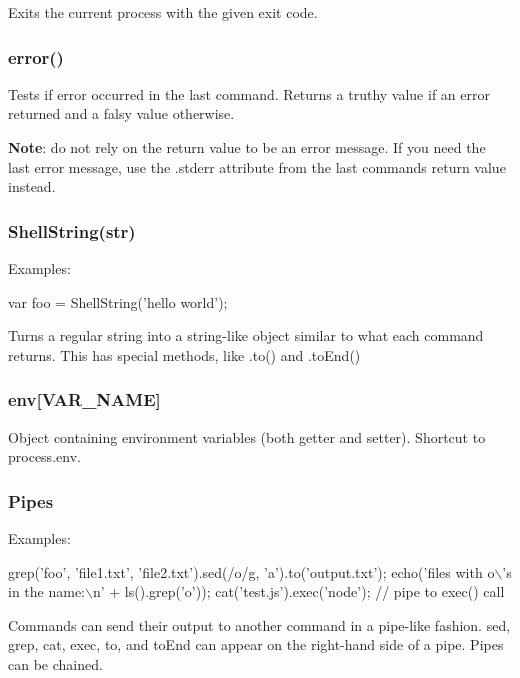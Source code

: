 Exits the current process with the given exit code.

\subsubsection*{error()}

Tests if error occurred in the last command. Returns a truthy value if an error returned and a falsy value otherwise.

{\bfseries Note}\+: do not rely on the return value to be an error message. If you need the last error message, use the {\ttfamily .stderr} attribute from the last command\textquotesingle{}s return value instead.

\subsubsection*{Shell\+String(str)}

Examples\+:


\begin{DoxyCode}
var foo = ShellString('hello world');
\end{DoxyCode}


Turns a regular string into a string-\/like object similar to what each command returns. This has special methods, like {\ttfamily .to()} and {\ttfamily .to\+End()}

\subsubsection*{env\mbox{[}\textquotesingle{}V\+A\+R\+\_\+\+N\+A\+ME\textquotesingle{}\mbox{]}}

Object containing environment variables (both getter and setter). Shortcut to process.\+env.

\subsubsection*{Pipes}

Examples\+:


\begin{DoxyCode}
grep('foo', 'file1.txt', 'file2.txt').sed(/o/g, 'a').to('output.txt');
echo('files with o\(\backslash\)'s in the name:\(\backslash\)n' + ls().grep('o'));
cat('test.js').exec('node'); // pipe to exec() call
\end{DoxyCode}


Commands can send their output to another command in a pipe-\/like fashion. {\ttfamily sed}, {\ttfamily grep}, {\ttfamily cat}, {\ttfamily exec}, {\ttfamily to}, and {\ttfamily to\+End} can appear on the right-\/hand side of a pipe. Pipes can be chained.

